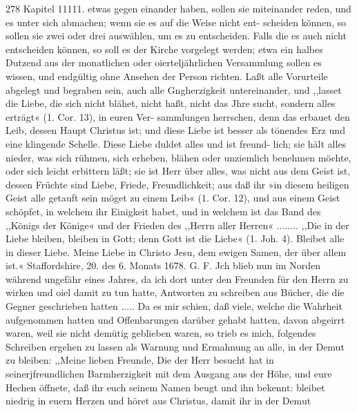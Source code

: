 278 Kapitel 11111.
etwas gegen einander haben, sollen sie miteinander reden, und
es unter sich abmachen; wenn sie es auf die Weise nicht ent-
scheiden können, so sollen sie zwei oder drei auswählen, um es
zu entscheiden. Falls die es auch nicht entscheiden können, so soll
es der Kirche vorgelegt werden; etwa ein halbes Dutzend aus der
monatlichen oder oierteljährlichen Versammlung sollen es wissen, und
endgültig ohne Ansehen der Person richten. Laßt alle Vorurteile
abgelegt und begraben sein, auch alle Gngherzigkeit untereinander,
und ,,lasset die Liebe, die sich nicht blähet, nicht haßt, nicht das
Jhre sucht, sondern alles erträgt« (1. Cor. 13), in euren Ver-
sammlungen herrschen, denn das erbauet den Leib, dessen Haupt
Christus ist; und diese Liebe ist besser als tönendes Erz und
eine klingende Schelle. Diese Liebe duldet alles und ist freund-
lich; sie hält alles nieder, was sich rühmen, sich erheben,
blähen oder unziemlich benehmen möchte, oder sich leicht erbittern
läßt; sie ist Herr über alles, was nicht aus dem Geist ist, dessen
Früchte sind Liebe, Friede, Freundlichkeit; aus daß ihr »in diesem
heiligen Geist alle getauft sein möget zu einem Leib« (1. Cor. 12),
und aus einem Geist schöpfet, in welchem ihr Einigkeit habet,
und in welchem ist das Band des ,,Königs der Könige« und
der Frieden des ,,Herrn aller Herren« ........ ,,Die in
der Liebe bleiben, bleiben in Gott; denn Gott ist die Liebe«
(1. Joh. 4). Bleibet alle in dieser Liebe. Meine Liebe in Christo
Jesu, dem ewigen Samen, der über allem ist.«
Staffordshire, 20. des 6. Monats 1678. G. F.
Jch blieb nun im Norden während ungefähr eines Jahres,
da ich dort unter den Freunden für den Herrn zu wirken
und oiel damit zu tun hatte, Antworten zu schreiben aus Bücher,
die die Gegner geschrieben hatten ..... Da es mir schien, daß
viele, welche die Wahrheit aufgenommen hatten und Offenbarungen
darüber gehabt hatten, davon abgeirrt waren, weil sie nicht
demütig geblieben waren, so trieb es mich, folgendes Schreiben
ergehen zu lassen als Warnung und Ermahnung an alle, in der
Demut zu bleiben:
,,Meine lieben Freunde,
Die der Herr besucht hat in seinerjfreundlichen Barmherzigkeit
mit dem Ausgang aus der Höhe, und eure Hechen öffnete, daß
ihr euch seinem Namen beugt und ihn bekennt: bleibet niedrig in
euern Herzen und höret aus Christus, damit ihr in der Demut


